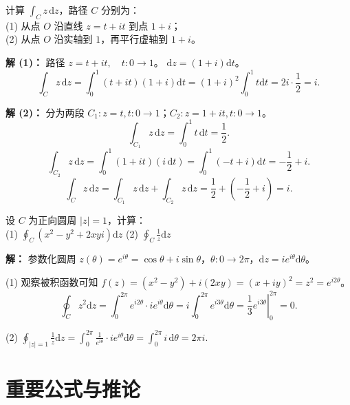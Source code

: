 \begin{tcolorbox}[title=例 1, colframe=orange!75!black, colback=orange!5!white, sharp corners]
	计算 $\displaystyle \int_C z \, \mathrm{d}z$，路径 $C$ 分别为：\\
	(1) 从点 $O$ 沿直线 $z=t+it$ 到点 $1+i$；\\
	(2) 从点 $O$ 沿实轴到 $1$，再平行虚轴到 $1+i$。
	
	\tcbline
	
	\textbf{解 (1)：} 路径 $z = t + it, \quad t: 0 \to 1$。
	$\mathrm{d}z = (1+i)\mathrm{d}t$。
	\[
	\int_C z \, \mathrm{d}z = \int_0^1 (t + it)(1+i) \mathrm{d}t = (1+i)^2 \int_0^1 t \mathrm{d}t = 2i \cdot \frac{1}{2} = i.
	\]
	
	\textbf{解 (2)：} 分为两段 $C_1: z=t, t:0\to 1$；$C_2: z=1+it, t:0\to 1$。
	\[
	\int_{C_1} z \, \mathrm{d}z = \int_0^1 t \, \mathrm{d}t = \frac{1}{2}.
	\]
	\[
	\int_{C_2} z \, \mathrm{d}z = \int_0^1 (1+it)(i \, \mathrm{d}t) = \int_0^1 (-t+i) \mathrm{d}t = -\frac{1}{2} + i.
	\]
	\[
	\int_C z \, \mathrm{d}z = \int_{C_1} z \, \mathrm{d}z + \int_{C_2} z \, \mathrm{d}z = \frac{1}{2} + \left(-\frac{1}{2} + i\right) = i.
	\]
\end{tcolorbox}

\begin{tcolorbox}[title=例 2, colframe=orange!75!black, colback=orange!5!white, sharp corners]
	设 $C$ 为正向圆周 $|z|=1$，计算：\\
	(1) $\displaystyle \oint_C (x^2 - y^2 + 2xyi) \mathrm{d}z$ \qquad
	(2) $\displaystyle \oint_C \frac{1}{z} \mathrm{d}z$
	
	\tcbline
	
	\textbf{解：} 参数化圆周 $z(\theta) = e^{i\theta} = \cos\theta + i\sin\theta$，$\theta: 0 \to 2\pi$，$\mathrm{d}z = i e^{i\theta} \mathrm{d} \theta$。
	
	(1) 观察被积函数可知 $f(z) = (x^2-y^2) + i(2xy) = (x+iy)^2 = z^2 = e^{i2\theta}$。
	\[
	\oint_C z^2 \mathrm{d}z = \int_0^{2\pi} e^{i2\theta} \cdot i e^{i\theta} \mathrm{d}\theta = i \int_0^{2\pi} e^{i3\theta} \mathrm{d}\theta = \left. \frac{1}{3} e^{i3\theta} \right|_0^{2\pi} = 0.
	\]
	
	(2) $\displaystyle \oint_{|z|=1} \frac{1}{z} \mathrm{d}z = \int_0^{2\pi} \frac{1}{e^{i\theta}} \cdot i e^{i\theta} \mathrm{d}\theta = \int_0^{2\pi} i \, \mathrm{d}\theta = 2\pi i$.
\end{tcolorbox}

\section{重要公式与推论}


